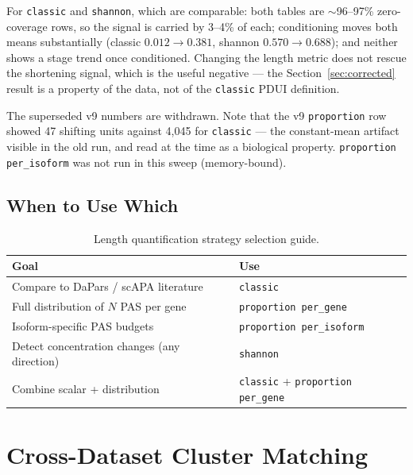 \documentclass[11pt,a4paper]{article}
\begin{document}
For \texttt{classic} and \texttt{shannon}, which are comparable: both tables are
$\sim$96--97\% zero-coverage rows, so the signal is carried by 3--4\% of each;
conditioning moves both means substantially (classic $0.012 \rightarrow 0.381$,
shannon $0.570 \rightarrow 0.688$); and neither shows a stage trend once
conditioned. Changing the length metric does not rescue the shortening signal,
which is the useful negative --- the Section~\ref{sec:corrected} result is a
property of the data, not of the \texttt{classic} PDUI definition.

The superseded v9 numbers are withdrawn. Note that the v9 \texttt{proportion} row
showed 47 shifting units against 4,045 for \texttt{classic} --- the constant-mean
artifact visible in the old run, and read at the time as a biological property.
\texttt{proportion per\_isoform} was not run in this sweep (memory-bound).

\subsection{When to Use Which}

\begin{table}[htbp]
  \centering
  \caption{Length quantification strategy selection guide.}
  \label{tab:length_guide}
  \begin{tabularx}{\textwidth}{lX}
    \toprule
    \textbf{Goal} & \textbf{Use} \\
    \midrule
    Compare to DaPars / scAPA literature & \texttt{classic} \\
    Full distribution of $N$ PAS per gene & \texttt{proportion per\_gene} \\
    Isoform-specific PAS budgets & \texttt{proportion per\_isoform} \\
    Detect concentration changes (any direction) & \texttt{shannon} \\
    Combine scalar + distribution & \texttt{classic} + \texttt{proportion per\_gene} \\
    \bottomrule
  \end{tabularx}
\end{table}

\section{Cross-Dataset Cluster Matching}
\label{sec:cross_dataset_match}
\end{document}
